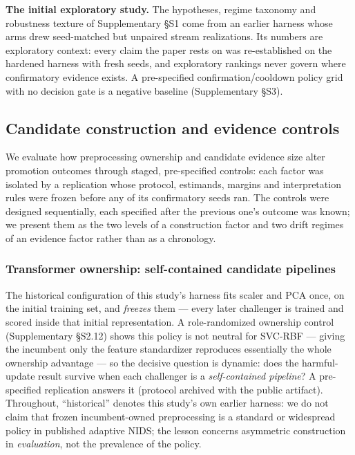 \documentclass[journal]{IEEEtran}
\begin{document}
\textbf{The initial exploratory study.} The hypotheses, regime taxonomy and robustness texture of Supplementary \S S1 come from an earlier harness whose arms drew seed-matched but unpaired stream realizations. Its numbers are exploratory context: every claim the paper rests on was re-established on the hardened harness with fresh seeds, and exploratory rankings never govern where confirmatory evidence exists. A pre-specified confirmation/cooldown policy grid with no decision gate is a negative baseline (Supplementary \S S3).


\subsection{Candidate construction and evidence controls}
\label{sec:construction}

We evaluate how preprocessing ownership and candidate evidence size alter promotion outcomes through staged, pre-specified controls: each factor was isolated by a replication whose protocol, estimands, margins and interpretation rules were frozen before any of its confirmatory seeds ran. The controls were designed sequentially, each specified after the previous one's outcome was known; we present them as the two levels of a construction factor and two drift regimes of an evidence factor rather than as a chronology.

\subsubsection{Transformer ownership: self-contained candidate pipelines}
\label{sec:symmetric_method}

The historical configuration of this study's harness fits scaler and PCA once, on the initial training set, and \emph{freezes} them --- every later challenger is trained and scored inside that initial representation. A role-randomized ownership control (Supplementary \S S2.12) shows this policy is not neutral for SVC-RBF --- giving the incumbent only the feature standardizer reproduces essentially the whole ownership advantage --- so the decisive question is dynamic: does the harmful-update result survive when each challenger is a \emph{self-contained pipeline}? A pre-specified replication answers it (protocol archived with the public artifact). Throughout, ``historical'' denotes this study's own earlier harness: we do not claim that frozen incumbent-owned preprocessing is a standard or widespread policy in published adaptive NIDS; the lesson concerns asymmetric construction in \emph{evaluation}, not the prevalence of the policy.
\end{document}
